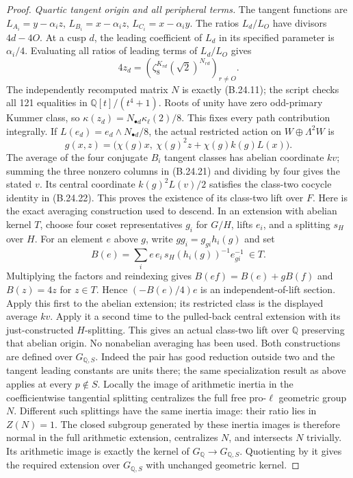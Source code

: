 \begin{proof}
\emph{Quartic tangent origin and all peripheral terms.}
The tangent functions are
$L_{A_i}=y-\alpha_i z$, $L_{B_i}=x-\alpha_i z$,
$L_{C_i}=x-\alpha_i y$.
The ratios $L_d/L_O$ have divisors $4d-4O$. At a cusp $d$, the leading
coefficient of $L_d$ in its specified parameter is
$\alpha_i/4$. Evaluating all ratios of leading terms
of $L_d/L_O$ gives
\[
 4z_d=(\zeta_8^{K_{rd}}(\sqrt2)^{N_{rd}})_{r\ne O}.
                                                               \tag{B.24.21}
\]
The independently recomputed matrix $N$ is exactly
(B.24.11); the script checks all 121 equalities in
$\mathbb Q[t]/(t^4+1)$. Roots of unity have zero
odd-primary Kummer class, so
$\kappa(z_d)=N_{\bullet d}\kappa_\ell(2)/8$.
This fixes every path contribution integrally.
If $L(e_d)=e_d\wedge N_{\bullet d}/8$, the actual
restricted action on $W\oplus\Lambda^2W$ is
\[
 g(x,z)=\bigl(\chi(g)x,\
        \chi(g)^2z+\chi(g)k(g)L(x)\bigr).
                                                               \tag{B.24.22}
\]
The average of the four conjugate $B_i$ tangent classes
has abelian coordinate $k v$; summing the three nonzero
columns in (B.24.21) and dividing by four gives
the stated $v$. Its central coordinate
$k(g)^2L(v)/2$ satisfies the class-two cocycle identity
in (B.24.22). This proves the existence of its
class-two lift over $F$.
Here is the exact averaging construction used to descend.
In an extension with abelian kernel $T$, choose four
coset representatives $g_i$ for $G/H$, lifts $e_i$,
and a splitting $s_H$ over $H$.
For an element $e$ above $g$, write
$gg_i=g_{gi}h_i(g)$ and set
\[
 B(e)=\sum_i
       e\,e_i\,s_H(h_i(g))^{-1}e_{gi}^{-1}\ \in T .
\]
Multiplying the factors and reindexing gives
$B(ef)=B(e)+gB(f)$ and $B(z)=4z$ for $z\in T$.
Hence $(-B(e)/4)e$ is an independent-of-lift section.
Apply this first to the abelian extension; its restricted
class is the displayed average $kv$.
Apply it a second time to the pulled-back central
extension with its just-constructed $H$-splitting.
This gives an actual class-two lift over $\mathbb Q$
preserving that abelian origin. No nonabelian averaging
has been used.
Both constructions are defined over $G_{\mathbb Q,S}$.
Indeed the pair has good reduction outside two and
the tangent leading constants are units there;
the same specialization result as above applies at
every $p\notin S$. Locally the image of arithmetic
inertia in the coefficientwise tangential splitting
centralizes the full free pro-$\ell$ geometric group $N$.
Different such splittings have the same inertia image:
their ratio lies in $Z(N)=1$.
The closed subgroup generated by these inertia images
is therefore normal in the full arithmetic extension,
centralizes $N$, and intersects $N$ trivially.
Its arithmetic image is exactly the kernel of
$G_{\mathbb Q}\to G_{\mathbb Q,S}$.
Quotienting by it gives the required extension over
$G_{\mathbb Q,S}$ with unchanged geometric kernel.


\end{proof}
